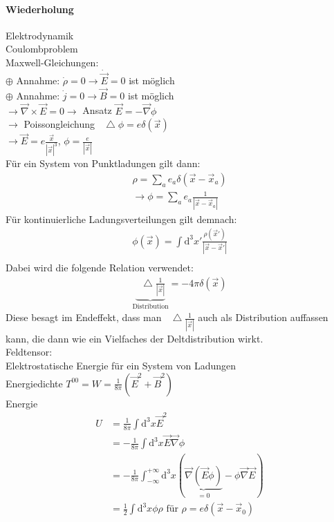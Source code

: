 \documentclass[a4paper]{article}
\newcommand*\laplace{\mathop{}\!\mathbin\bigtriangleup}
\begin{document}
\paragraph{Wiederholung}
Elektrodynamik\\
Coulombproblem\\
Maxwell-Gleichungen:\\
$\oplus$ Annahme: $\dot{\rho}=0\rightarrow \dot{\vec{E}}=0$ ist möglich\\
$\oplus$ Annahme: $\dot{j}=0\rightarrow \vec{B}=0$ ist möglich\\
$\rightarrow \vec{\nabla}\times\vec{E}=0 \rightarrow$ Ansatz
$\vec{E}=-\vec{\nabla}\phi$\\
$\rightarrow$ Poissongleichung $\laplace\phi=e\delta(\vec{x})$\\
$\rightarrow \vec{E}=e\frac{\vec{x}}{|\vec{x}|^3}$, $\phi=\frac{e}{|\vec{x}|}$\\
Für ein System von Punktladungen gilt dann:
\begin{align}
\rho=\sum_a e_a \delta(\vec{x}-\vec{x}_a)\\
\rightarrow \phi=\sum_a e_a \frac{1}{|\vec{x}-\vec{x}_a|}
\end{align}
Für kontinuierliche Ladungsverteilungen gilt demnach:
\begin{align}
\phi(\vec{x})=\int \mathrm{d}^3x'\frac{\rho(\vec{x}')}{|\vec{x}-\vec{x}'|}\\
\end{align}
Dabei wird die folgende Relation verwendet:
\begin{align}
\underbrace{\laplace
\frac{1}{|\vec{x}|}}_{\text{Distribution}}=-4\pi\delta(\vec{x})
\end{align}
Diese besagt im Endeffekt, dass man $\laplace \frac{1}{|\vec{x}|}$ auch als
Distribution auffassen kann, die dann wie ein Vielfaches der Deltdistribution
wirkt.\\
Feldtensor:\\
Elektrostatische Energie für ein System von Ladungen\\
Energiedichte $T^{00}=W=\frac{1}{8\pi}\left(\vec{E}^2+\vec{B}^2\right)$\\
Energie 
\begin{align}
U&=\frac{1}{8\pi}\int \mathrm{d}^3x \vec{E}^2\\
&=-\frac{1}{8\pi}\int \mathrm{d}^3x \vec{E}\vec{\nabla}\phi\\
&=-\frac{1}{8\pi}\int^{+\infty}_{-\infty} \mathrm{d}^3x \left(
\underbrace{\vec{\nabla}\left(\vec{E}\phi\right)}_{=0}-\phi\vec{\nabla}\vec{E}\right)\\
&=\frac{1}{2}\int \mathrm{d}^3x\phi\rho \text{ für } \rho=e\delta(\vec{x}-\vec{x}_0)
\end{align}
\end{document}
